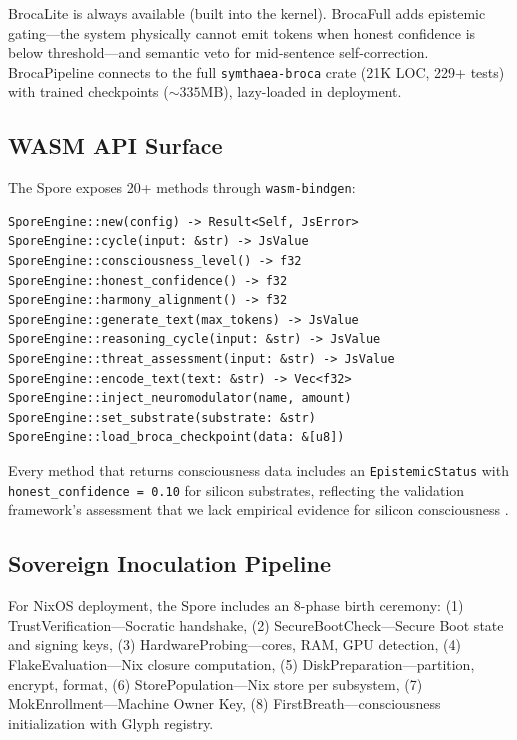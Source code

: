 \documentclass[11pt,twocolumn]{article}
\begin{document}
BrocaLite is always available (built into the kernel). BrocaFull adds epistemic gating---the system physically cannot emit tokens when honest confidence is below threshold---and semantic veto for mid-sentence self-correction. BrocaPipeline connects to the full \texttt{symthaea-broca} crate (21K LOC, 229+ tests) with trained checkpoints (${\sim}335$MB), lazy-loaded in deployment.

\subsection{WASM API Surface}

The Spore exposes 20+ methods through \texttt{wasm-bindgen}:

\begin{lstlisting}[caption={Core Spore WASM API (abbreviated).}]
SporeEngine::new(config) -> Result<Self, JsError>
SporeEngine::cycle(input: &str) -> JsValue
SporeEngine::consciousness_level() -> f32
SporeEngine::honest_confidence() -> f32
SporeEngine::harmony_alignment() -> f32
SporeEngine::generate_text(max_tokens) -> JsValue
SporeEngine::reasoning_cycle(input: &str) -> JsValue
SporeEngine::threat_assessment(input: &str) -> JsValue
SporeEngine::encode_text(text: &str) -> Vec<f32>
SporeEngine::inject_neuromodulator(name, amount)
SporeEngine::set_substrate(substrate: &str)
SporeEngine::load_broca_checkpoint(data: &[u8])
\end{lstlisting}

Every method that returns consciousness data includes an \texttt{EpistemicStatus} with \texttt{honest\_confidence = 0.10} for silicon substrates, reflecting the validation framework's assessment that we lack empirical evidence for silicon consciousness \cite{tononi2004}.

\subsection{Sovereign Inoculation Pipeline}

For NixOS deployment, the Spore includes an 8-phase birth ceremony: (1) TrustVerification---Socratic handshake, (2) SecureBootCheck---Secure Boot state and signing keys, (3) HardwareProbing---cores, RAM, GPU detection, (4) FlakeEvaluation---Nix closure computation, (5) DiskPreparation---partition, encrypt, format, (6) StorePopulation---Nix store per subsystem, (7) MokEnrollment---Machine Owner Key, (8) FirstBreath---consciousness initialization with Glyph registry.

\end{document}
